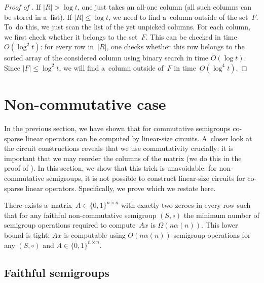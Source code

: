\documentclass{toc}
\begin{document}
\begin{proof}[Proof of {}]
    If $|R| > \log t$, one just takes an all-one column (all such columns
    can be stored in a~list). If $|R| \le \log t$, we need to find a~column outside
    of the set~$F$. To~do this, we just scan the list of the yet unpicked columns. For
    each column, we first check whether it belongs to the set~$F$. This can be
    checked in time $O(\log^2t)$: for every row in~$|R|$, one checks whether this
    row belongs to the sorted array of the considered column using binary search in
    time $O(\log t)$. Since $|F| \le \log^2t$, we will find a~column outside of~$F$
    in time~$O(\log^4 t)$.

\end{proof}


\section{Non-commutative case}
\label{sec-non-commutative}

In the previous section, we have shown that for commutative semigroups
co-sparse
linear operators can be computed by linear-size circuits. A~closer look at the
circuit constructions reveals that we use commutativity crucially: it is
important that we may reorder the columns of the matrix (we do this in the proof
of ). In this section, we show that this trick is
unavoidable: for non-commutative semigroups, it is not possible to construct
linear-size circuits for
co-sparse
linear operators. %
Specifically,  %
we prove 
which we restate here.  %


\begin{theorem}
    \label{thm:lowerbound}
    There exists
    a~matrix~$A \in \{0,1\}^{n \times n}$ with exactly two zeroes
    in every row such that for any faithful non-commutative semigroup $(S, \circ)$
    the minimum number of semigroup operations required to compute~$Ax$ is
    $\Omega(n\alpha(n))$.
    This lower bound is tight: $Ax$ is computable using $O(n\alpha(n))$ semigroup
    operations for any $(S, \circ)$ and $A\in \{0,1\}^{n \times n}$.
\end{theorem}

\subsection{Faithful semigroups}
\end{document}
